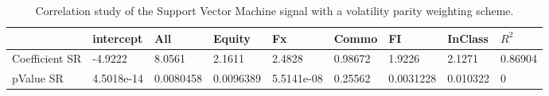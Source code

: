 \begin{table}[H]
\centering
\begin{tabular}{lllllllll}
\hline& intercept & All & Equity & Fx & Commo & FI & InClass & $R^{2}$ \\ 
\hline 
Coefficient SR & -4.9222 & 8.0561 & 2.1611 & 2.4828 & 0.98672 & 1.9226 & 2.1271 & 0.86904 \\ 
pValue SR & 4.5018e-14 & 0.0080458 & 0.0096389 & 5.5141e-08 & 0.25562 & 0.0031228 & 0.010322 & 0 \\ 
\hline
\end{tabular}
\caption{Correlation study of the Support Vector Machine signal with a volatility parity weighting scheme.}
\label{SVM_VP_CORR}
\end{table}